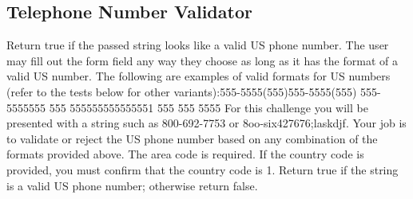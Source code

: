\documentclass{article}%
\begin{document}
\subsection{Telephone Number Validator}%
\label{subsec:TelephoneNumberValidator}%
Return true if the passed string looks like a valid US phone number.\newline%
The user may fill out the form field any way they choose as long as it has the format of a valid US number. The following are examples of valid formats for US numbers (refer to the tests below for other variants):555{-}5555(555)555{-}5555(555) 555{-}5555555 555 555555555555551 555 555 5555\newline%
For this challenge you will be presented with a string such as 800{-}692{-}7753 or 8oo{-}six427676;laskdjf. Your job is to validate or reject the US phone number based on any combination of the formats provided above. The area code is required. If the country code is provided, you must confirm that the country code is 1. Return true if the string is a valid US phone number; otherwise return false.\newline%

%
\end{document}

